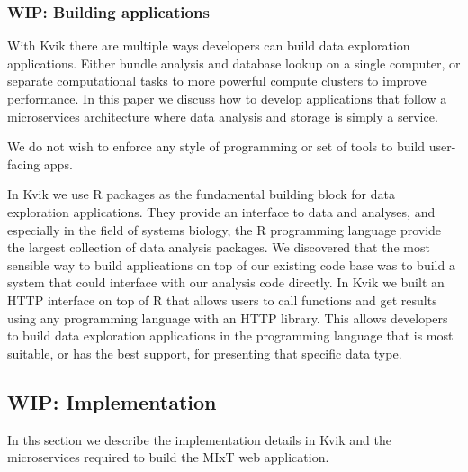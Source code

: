 


\subsubsection*{WIP: Building applications} 
With Kvik there are multiple ways developers can build data
exploration applications. Either bundle analysis and database lookup on a single
computer, or separate computational tasks to more powerful compute clusters to
improve performance. 
In this paper we discuss how to develop applications that follow a
microservices architecture where data analysis and storage is simply a service. 

We do not wish to enforce any style of programming or set of tools to build
user-facing apps. 

In Kvik we use R packages as the fundamental building block for data exploration
applications. They provide an interface to data and analyses, and especially in
the field of systems biology, the R programming language provide the largest
collection of data analysis packages. %
We discovered that the most sensible way to build applications on top of our
existing code base was to build a system that could interface with our analysis
code directly. In Kvik we built an HTTP interface on top of R that allows users
to call functions and get results using any programming language with an HTTP
library. This allows developers to build data exploration applications in the
programming language that is most suitable, or has the best support, for
presenting that specific data type. 

\subsection*{WIP: Implementation}
In ths section we describe the implementation details in Kvik and the
microservices required to build the MIxT web application. 

